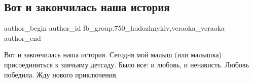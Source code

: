  
 
 
 
 

\subsection{Вот и закончилась наша история}
\label{sec:03_04_2018.fb.fb_group.750_hudozhnykiv.7.vot_i_zakonchilas_nasha_istoria}
 
\ifcmt
 author_begin
   author_id fb_group.750_hudozhnykiv,veraoka_veraoka
 author_end
\fi

Вот и закончилась наша история. Сегодня мой малыш (или малышка) присоединиться
к заячьяму детсаду. Было все: и любовь, и ненависть. Любовь победила. Жду
нового приключения.

